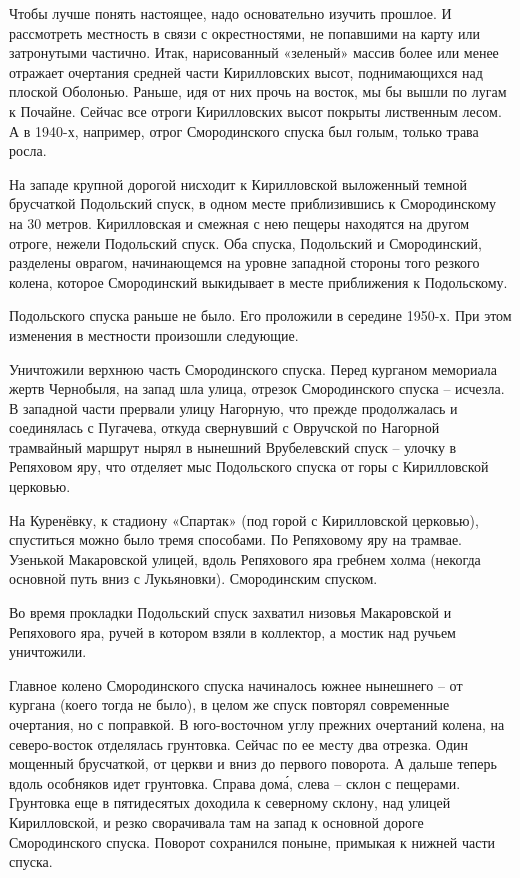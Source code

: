 Чтобы лучше понять настоящее, надо основательно изучить прошлое. И рассмотреть местность в связи с окрестностями, не попавшими на карту или затронутыми частично. Итак, нарисованный «зеленый» массив более или менее отражает очертания средней части Кирилловских высот, поднимающихся над плоской Оболонью. Раньше, идя от них прочь на восток, мы бы вышли по лугам к Почайне. Сейчас все отроги Кирилловских высот покрыты лиственным лесом. А в 1940-х, например, отрог Смородинского спуска был голым, только трава росла. 

На западе крупной дорогой нисходит к Кирилловской выложенный темной брусчаткой Подольский спуск, в одном месте приблизившись к Смородинскому на 30 метров. Кирилловская и смежная с нею пещеры находятся на другом отроге, нежели Подольский спуск. Оба спуска, Подольский и Смородинский, разделены оврагом, начинающемся на уровне западной стороны того резкого колена, которое Смородинский выкидывает в месте приближения к Подольскому.

Подольского спуска раньше не было. Его проложили в середине 1950-х. При этом изменения в местности произошли следующие. 

Уничтожили верхнюю часть Смородинского спуска. Перед курганом мемориала жертв Чернобыля, на запад шла улица, отрезок Смородинского спуска – исчезла. В западной части прервали улицу Нагорную, что прежде продолжалась и соединялась с Пугачева, откуда свернувший с Овручской по Нагорной трамвайный маршрут нырял в нынешний Врубелевский спуск – улочку в Репяховом яру, что отделяет мыс Подольского спуска от горы с Кирилловской церковью.

На Куренёвку, к стадиону «Спартак» (под горой с Кирилловской церковью), спуститься можно было тремя способами. По Репяховому яру на трамвае. Узенькой Макаровской улицей, вдоль Репяхового яра гребнем холма (некогда основной путь вниз с Лукьяновки). Смородинским спуском.

Во время прокладки Подольский спуск захватил низовья Макаровской и Репяхового яра, ручей в котором взяли в коллектор, а мостик над ручьем уничтожили. 

Главное колено Смородинского спуска начиналось южнее нынешнего –  от кургана (коего тогда не было), в целом же спуск повторял современные очертания, но с поправкой. В юго-восточном углу прежних очертаний колена, на северо-восток отделялась грунтовка. Сейчас по ее месту два отрезка. Один мощенный брусчаткой, от церкви и вниз до первого поворота. А дальше теперь вдоль особняков идет грунтовка. Справа дом\'а, слева – склон с пещерами. Грунтовка еще в пятидесятых доходила к северному склону, над улицей Кирилловской, и резко сворачивала там на запад к основной дороге Смородинского спуска. Поворот сохранился поныне, примыкая к нижней части спуска.

